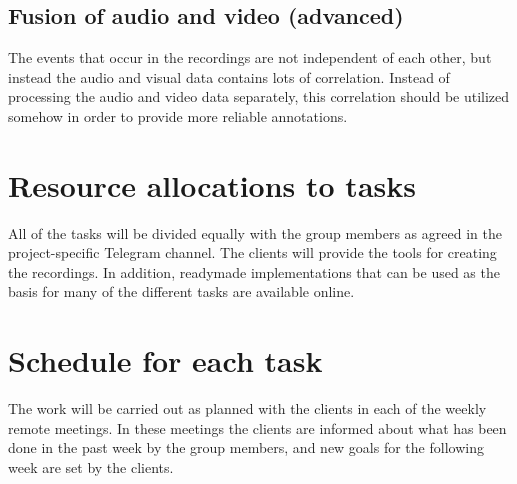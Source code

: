 \subsection{Fusion of audio and video (advanced)}

The events that occur in the recordings are not independent of each other, but instead the audio and visual data
contains lots of correlation. Instead of processing the audio and video data separately, this correlation should
be utilized somehow in order to provide more reliable annotations.



\section{Resource allocations to tasks}

All of the tasks will be divided equally with the group members as agreed in the project-specific Telegram 
channel. The clients will provide the tools for creating the recordings. In addition, readymade implementations
that can be used as the basis for many of the different tasks are available online.

\section{Schedule for each task}

The work will be carried out as planned with the clients in each of the weekly remote meetings. In these meetings
the clients are informed about what has been done in the past week by the group members, and new goals for the
following week are set by the clients.